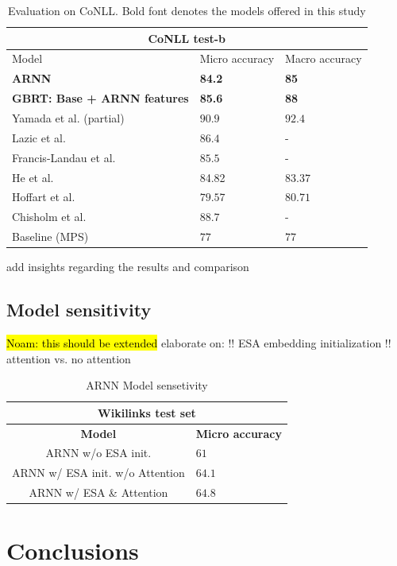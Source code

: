 \documentclass[11pt]{article}
\begin{document}
	
	\begin{table}[h]
		\begin{center}
			\begin{tabular}{|p{3.5cm}| p{1.5cm} p{1.5cm}|}
				\hline \multicolumn{3}{|c|}{CoNLL test-b} \\
				\hline Model & Micro     accuracy & Macro     accuracy \\ \hline
				\bf ARNN  & \bf 84.2 & \bf 85 \\
				\bf GBRT: Base + ARNN features & \bf 85.6 & \bf 88 \\
				Yamada et al. (partial) & $90.9$ & $92.4$ \\
				Lazic et al. & $86.4$ & - \\
				Francis-Landau et al. & $85.5$ & - \\
				He et al. & 84.82 & $83.37$ \\	
				Hoffart et al. & $79.57$ & $80.71$ \\
				Chisholm et al. & $88.7$ & - \\			
				Baseline (MPS) & $77$ & $77$ \\
				\hline
			\end{tabular}
		\end{center}
		\caption{\label{tab:a} Evaluation on CoNLL. Bold font denotes the models offered in this study}
	\end{table}

	
	add insights regarding the results and comparison 
	\subsection{Model sensitivity}
	
	\hl{Noam: this should be extended} elaborate on: \newline
	!! ESA embedding initialization \newline
	!! attention vs. no attention\newline
	
	\begin{table}[h]
	\begin{center}
		\begin{tabular}{|c| p{1.5cm}|}
			\hline \multicolumn{2}{|c|}{Wikilinks test set} \\
			\hline \bf Model & \bf Micro     accuracy  \\ \hline
			ARNN w/o ESA init. & $61$ \\
			ARNN w/ ESA init. w/o Attention & $64.1$ \\
			ARNN w/ ESA \& Attention & $64.8$ \\ 
			\hline
		\end{tabular}
	\end{center}
	\caption{\label{tab:c} ARNN Model sensetivity}
	\end{table}

	\section{Conclusions}
	
	
	
	
\end{document}
